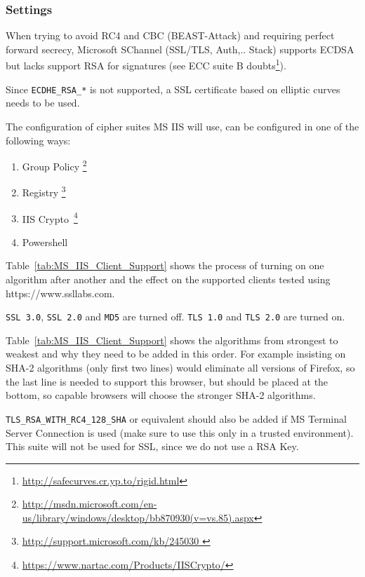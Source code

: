 \subsubsection{Settings}
When trying to avoid RC4 and CBC (BEAST-Attack) and requiring perfect
forward secrecy, Microsoft SChannel (SSL/TLS, Auth,.. Stack) supports
ECDSA but lacks support RSA for signatures (see ECC suite
B doubts\footnote{\url{http://safecurves.cr.yp.to/rigid.html}}).

Since \verb|ECDHE_RSA_*| is not supported, a SSL certificate based on
elliptic curves needs to be used.

The configuration of cipher suites MS IIS will use, can be configured in one
of the following ways:
\begin{enumerate}
  \item Group Policy \footnote{\url{http://msdn.microsoft.com/en-us/library/windows/desktop/bb870930(v=vs.85).aspx}}
  \item Registry  \footnote{\url{http://support.microsoft.com/kb/245030 }}
  \item IIS Crypto~\footnote{\url{https://www.nartac.com/Products/IISCrypto/}}
  \item Powershell 
\end{enumerate}


Table~\ref{tab:MS_IIS_Client_Support} shows the process of turning on
one algorithm after another and the effect on the supported clients
tested using https://www.ssllabs.com.

\verb|SSL 3.0|, \verb|SSL 2.0| and \verb|MD5| are turned off.
\verb|TLS 1.0| and \verb|TLS 2.0| are turned on.


Table~\ref{tab:MS_IIS_Client_Support} shows the algorithms from
strongest to weakest and why they need to be added in this order. For
example insisting on SHA-2 algorithms (only first two lines) would
eliminate all versions of Firefox, so the last line is needed to
support this browser, but should be placed at the bottom, so capable
browsers will choose the stronger SHA-2 algorithms.

\verb|TLS_RSA_WITH_RC4_128_SHA| or equivalent should also be added if
MS Terminal Server Connection is used (make sure to use this only in a
trusted environment). This suite will not be used for SSL, since we do
not use a RSA Key.

